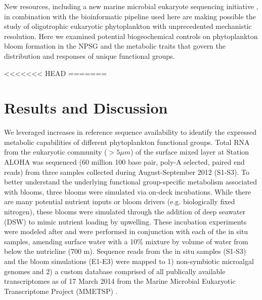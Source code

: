 New resources, including a new marine microbial eukaryote sequencing initiative \citep{Keeling2014}, in combination with the bioinformatic pipeline used here are making possible the study of oligotrophic eukaryotic phytoplankton with unprecedented mechanistic resolution. Here we examined potential biogeochemical controls on phytoplankton bloom formation in the NPSG and the metabolic traits that govern the distribution and responses of unique functional groups. \par
<<<<<<< HEAD
=======
\section{Results and Discussion}
We leveraged increases in reference sequence availability \citep{Keeling2014} to identify the expressed metabolic capabilities of different phytoplankton functional groups. Total RNA from the eukaryotic community ($>5 \mu m$) of the surface mixed layer at Station ALOHA was sequenced (60 million 100 base pair, poly-A selected, paired end reads) from three samples collected during August-September 2012 (S1-S3). To better understand the underlying functional group-specific metabolism associated with blooms, three blooms were simulated via on-deck incubations. While there are many potential nutrient inputs or bloom drivers (e.g. biologically fixed nitrogen), these blooms were simulated through the addition of deep seawater (DSW) to mimic nutrient loading by upwelling.  These incubation experiments were modeled after \citet{McAndrew2007} and were performed in conjunction with each of the in situ samples, amending surface water with a 10\% mixture by volume of water from below the nutricline (700 m). Sequence reads from the in situ samples (S1-S3) and the bloom simulations (E1-E3) were mapped to 1) non-symbiotic microalgal genomes and 2) a custom database comprised of all publically available transcriptomes as of 17 March 2014 from the Marine Microbial Eukaryotic Transcriptome Project (MMETSP) \citep{Keeling2014}.\par 
